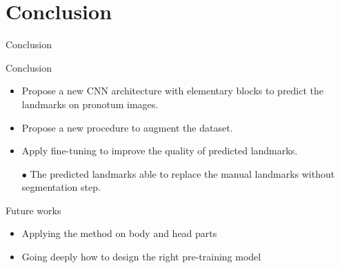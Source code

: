 \documentclass[10pt,svgnames]{beamer}
\begin{document}
\section{Conclusion}
\begin{frame}{Conclusion}
	\begin{block}{Conclusion}
		\small{
			\begin{itemize}
				\item Propose a new CNN architecture with elementary blocks to predict the landmarks on pronotum images.
				\item Propose a new procedure to augment the dataset.
				\item Apply fine-tuning to improve the quality of predicted landmarks.
				\item[\textcolor{citem}{$\bullet$}] The predicted landmarks able to replace the manual landmarks without segmentation step.
			\end{itemize}
		}
	\end{block}
	\pause
	\begin{block}{Future works}
		\small{
			\begin{itemize}
				\item Applying the method on body and head parts 
				\item Going deeply how to design the right pre-training model
			\end{itemize}					
			}
	\end{block}
\end{frame}

{\1
\begin{frame}
\end{frame}}
\end{document}
